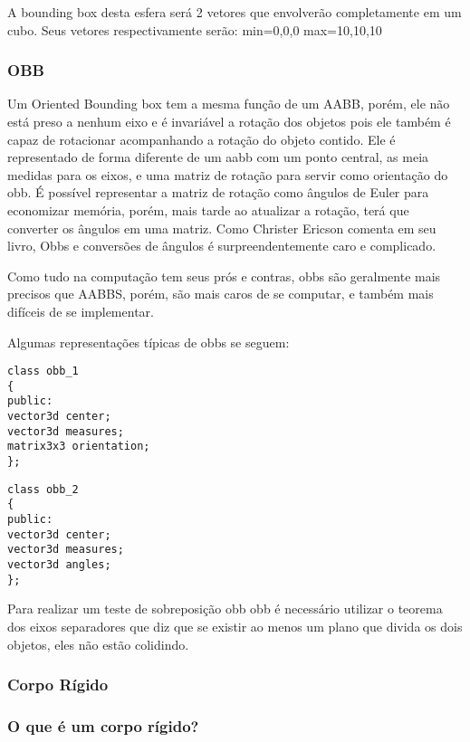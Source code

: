 A bounding box desta esfera será 2 vetores que envolverão completamente em um cubo.
Seus vetores respectivamente serão:
min={0,0,0}
max={10,10,10}


\subsubsection{OBB}

Um Oriented Bounding box tem a mesma função de um AABB, porém, ele não está
preso a nenhum eixo e é invariável a rotação dos objetos pois ele também é
capaz de rotacionar acompanhando a rotação do objeto contido. Ele é
representado de forma diferente de um aabb com um ponto central, as meia
medidas para os eixos, e uma matriz de rotação para servir como orientação do
obb. É possível representar a matriz de rotação como ângulos de Euler para
economizar memória, porém, mais tarde ao atualizar a rotação, terá que
converter os ângulos em uma matriz. Como Christer Ericson comenta em seu livro,
Obbs e conversões de ângulos é surpreendentemente caro e complicado.

Como tudo na computação tem seus prós e contras, obbs são geralmente mais
precisos que AABBS, porém, são mais caros de se computar, e também mais
difíceis de se implementar.


Algumas representações típicas de obbs se seguem:

\begin{lstlisting}[frame=single,caption=Código de exemplo de OBB\label{code:obb_1}]
class obb_1
{
public:
vector3d center;
vector3d measures;
matrix3x3 orientation;
};
\end{lstlisting}

\begin{lstlisting}[frame=single,caption=Exemplo de OBB\label{code:obb_2}]
class obb_2
{
public:
vector3d center;
vector3d measures;
vector3d angles;
};
\end{lstlisting}

Para realizar um teste de sobreposição obb obb é necessário utilizar o teorema
dos eixos separadores que diz que se existir ao menos um plano que divida os
dois objetos, eles não estão colidindo.



\subsubsection{ Corpo Rígido}
\subsubsection{ O que é um corpo rígido?}

